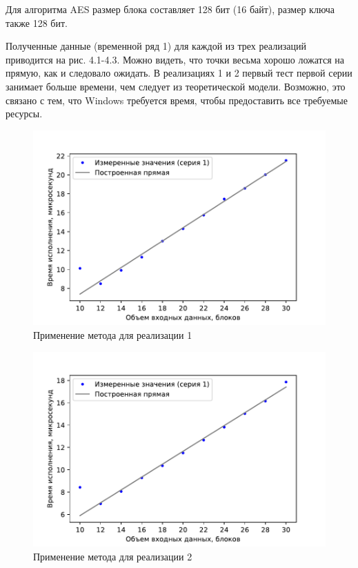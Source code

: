Для алгоритма AES размер блока составляет 128 бит (16 байт), размер ключа также 128 бит.

Полученные данные (временной ряд 1) для каждой из трех реализаций приводится на рис. 4.1-4.3. Можно видеть, что точки весьма хорошо ложатся на прямую, как и следовало ожидать. В реализациях 1 и 2 первый тест первой серии занимает больше времени, чем следует из теоретической модели. Возможно, это связано с тем, что Windows требуется время, чтобы предоставить все требуемые ресурсы.



\begin{figure}[ht!] 
	\includegraphics [scale=1.1] {my_folder/plots/plot1_notitle}
	\centering
	\caption{Применение метода для реализации 1} 
\end{figure}

\begin{figure}[ht!] 
	\includegraphics [scale=1.1] {my_folder/plots/plot2_notitle}
	\centering
	\caption{Применение метода для реализации 2} 
\end{figure}

